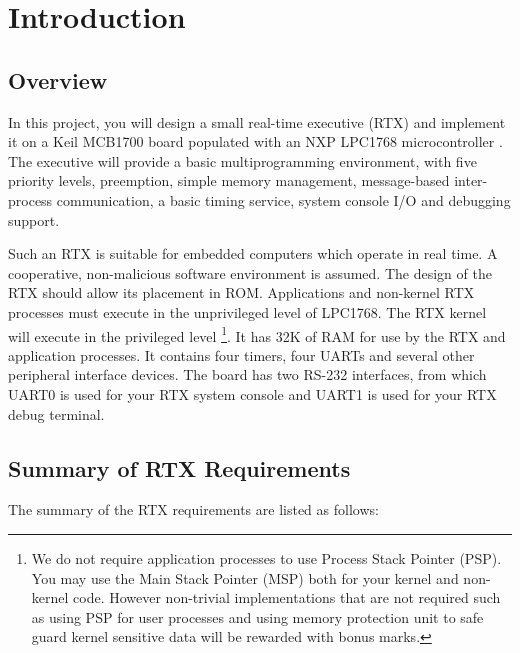 \chapter{Introduction}

\section{Overview}
In this project, you will design a small real-time executive (RTX) and implement it on a Keil MCB1700 board populated with an NXP LPC1768 microcontroller . The executive will provide a basic multiprogramming environment, with five priority levels, preemption, simple memory management, message-based inter-process communication, a basic timing service, system console I/O and debugging support. 

Such an RTX is suitable for embedded computers which operate in real time. A cooperative, non-malicious software environment is assumed. The design of the RTX should allow its placement in ROM. 
Applications and non-kernel RTX processes must execute in the unprivileged level of LPC1768. The RTX kernel will execute in the privileged level
\footnote{We do not require application processes to use Process Stack Pointer (PSP). You may use the Main Stack Pointer (MSP) both for your kernel and non-kernel code. However non-trivial implementations that are not required such as using PSP for user processes and using memory protection unit to safe guard kernel sensitive data will be rewarded with bonus marks.}.
It has 32K of RAM for use by the RTX and application processes. It contains four timers, four UARTs and several other peripheral interface devices. The board has two RS-232 interfaces, from which UART0 is used for your RTX system console and UART1 is used for your RTX debug terminal.

\section{Summary of RTX Requirements}

The summary of the RTX requirements are listed as follows:

